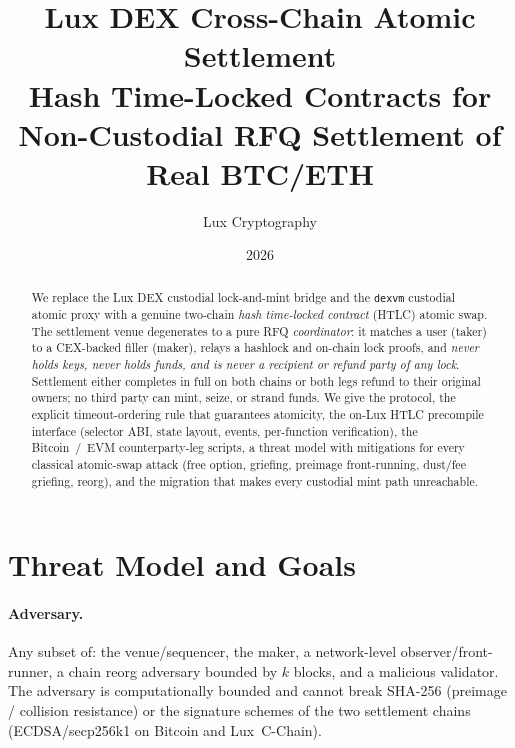 \documentclass[11pt]{article}
\title{\textbf{Lux DEX Cross-Chain Atomic Settlement}\\
\large Hash Time-Locked Contracts for Non-Custodial RFQ Settlement of Real BTC/ETH}
\author{Lux Cryptography}
\date{2026}
\begin{document}
\maketitle

\begin{abstract}
We replace the Lux DEX custodial lock-and-mint bridge and the \texttt{dexvm}
custodial atomic proxy with a genuine two-chain \emph{hash time-locked contract}
(HTLC) atomic swap. The settlement venue degenerates to a pure RFQ
\emph{coordinator}: it matches a user (taker) to a CEX-backed filler (maker),
relays a hashlock and on-chain lock proofs, and \emph{never holds keys, never
holds funds, and is never a recipient or refund party of any lock}. Settlement
either completes in full on both chains or both legs refund to their original
owners; no third party can mint, seize, or strand funds. We give the protocol,
the explicit timeout-ordering rule that guarantees atomicity, the on-Lux HTLC
precompile interface (selector ABI, state layout, events, per-function
verification), the Bitcoin~/~EVM counterparty-leg scripts, a threat model with
mitigations for every classical atomic-swap attack (free option, griefing,
preimage front-running, dust/fee griefing, reorg), and the migration that makes
every custodial mint path unreachable.
\end{abstract}

\section{Threat Model and Goals}

\paragraph{Adversary.} Any subset of: the venue/sequencer, the maker, a
network-level observer/front-runner, a chain reorg adversary bounded by $k$
blocks, and a malicious validator. The adversary is computationally bounded and
cannot break SHA-256 (preimage / collision resistance) or the signature schemes
of the two settlement chains (ECDSA/secp256k1 on Bitcoin and Lux~C-Chain).
\end{document}

